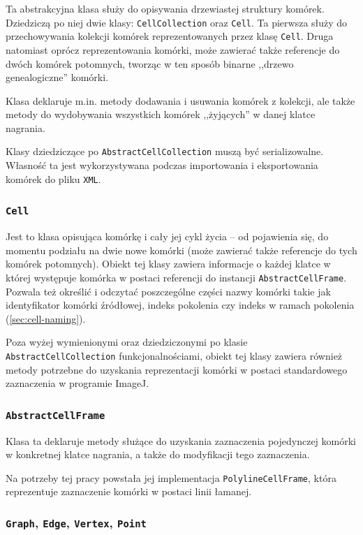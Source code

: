 \documentclass[declaration,shortabstract,mgr]{iithesis}
\begin{document}
Ta abstrakcyjna klasa służy do opisywania drzewiastej struktury komórek. Dziedziczą po niej dwie klasy: \texttt{CellCollection} oraz \texttt{Cell}.
Ta pierwsza służy do przechowywania kolekcji komórek reprezentowanych przez klasę \texttt{Cell}.
Druga natomiast oprócz reprezentowania komórki, może zawierać także referencje do dwóch komórek potomnych, tworząc w ten sposób binarne ,,drzewo genealogiczne'' komórki.

Klasa deklaruje m.in. metody dodawania i usuwania komórek z kolekcji, ale także metody do wydobywania wszystkich komórek ,,żyjących'' w danej klatce nagrania.

Klasy dziedziczące po \texttt{AbstractCellCollection} muszą być serializowalne.
Własność ta jest wykorzystywana podczas importowania i eksportowania komórek do pliku \texttt{XML}.

\subsubsection{\texttt{Cell}}

Jest to klasa opisująca komórkę i cały jej cykl życia -- od pojawienia się, do momentu podziału na dwie nowe komórki (może zawierać także referencje do tych komórek potomnych).
Obiekt tej klasy zawiera informacje o każdej klatce w której występuje komórka w postaci referencji do instancji \texttt{AbstractCellFrame}.
Pozwala też określić i odczytać poszczególne części nazwy komórki takie jak identyfikator komórki źródłowej, indeks pokolenia czy indeks w ramach pokolenia (\ref{sec:cell-naming}).

Poza wyżej wymienionymi oraz dziedziczonymi po klasie \texttt{AbstractCellCollection} funkcjonalnościami, obiekt tej klasy zawiera również metody potrzebne do uzyskania reprezentacji komórki w postaci standardowego zaznaczenia w programie ImageJ.

\subsubsection{\texttt{AbstractCellFrame}}

Klasa ta deklaruje metody służące do uzyskania zaznaczenia pojedynczej komórki w konkretnej klatce nagrania, a także do modyfikacji tego zaznaczenia.

Na potrzeby tej pracy powstała jej implementacja \texttt{PolylineCellFrame}, która reprezentuje zaznaczenie komórki w postaci linii łamanej.

\subsubsection{\texttt{Graph}, \texttt{Edge}, \texttt{Vertex}, \texttt{Point}}
\end{document}
